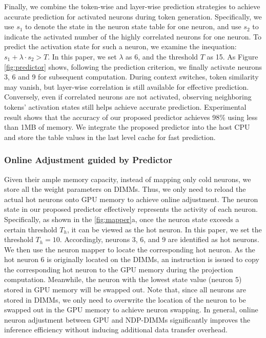 
Finally, we combine the token-wise and layer-wise prediction strategies to achieve accurate prediction for activated neurons during token generation. Specifically, we use $s_1$ to denote the state in the neuron state table for one neuron, and use $s_2$ to indicate the activated number of the highly correlated neurons for one neuron. To predict the activation state for such a neuron, we examine the inequation: $s_1 + \lambda\cdot s_2> T $. In this paper, we set $\lambda$ as 6, and the threshold $T$ as 15. As Figure \ref{fig:predictor} shows, following the prediction criterion, we finally activate neurons 3, 6 and 9 for subsequent computation. During context switches, token similarity may vanish, but layer-wise correlation is still available for effective prediction. Conversely, even if correlated neurons are not activated, observing neighboring tokens' activation states still helps achieve accurate prediction. Experimental result shows that the accuracy of our proposed predictor achieves 98\% using less than 1MB of memory.  We integrate the proposed predictor into the host CPU and store the table values in the last level cache for fast prediction.


\subsubsection{Online Adjustment guided by Predictor}
Given their ample memory capacity, instead of mapping only cold neurons, we store all the weight parameters on DIMMs. Thus, we only need to reload the actual hot neurons onto GPU memory to achieve online adjustment. The neuron state in our proposed predictor effectively represents the activity of each neuron. Specifically, as shown in the \fig \ref{fig:mapper}a, once the neuron state exceeds a certain threshold $T_h$, it can be viewed as the hot neuron. In this paper, we set the threshold $T_h = 10$. Accordingly, neurons 3, 6, and 9 are identified as hot neurons. We then use the neuron mapper to locate the corresponding hot neuron. As the hot neuron 6 is originally located on the DIMMs, an instruction is issued to copy the corresponding hot neuron to the GPU memory during the projection computation. Meanwhile, the neuron with the lowest state value (neuron 5) stored in GPU memory will be swapped out. Note that, since all neurons are stored in DIMMs, we only need to overwrite the location of the neuron to be swapped out in the GPU memory to achieve neuron swapping. In general, online neuron adjustment between GPU and NDP-DIMMs significantly improves the inference efficiency without inducing additional data transfer overhead.


